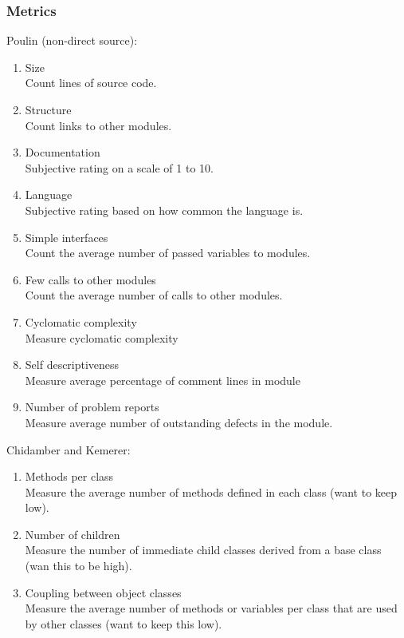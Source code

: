 \documentclass{article}
\begin{document}
\subsubsection{Metrics}
\noindent Poulin (non-direct source):
\begin{enumerate}
	\item Size\\
	
	Count lines of source code.
	\item Structure\\
	
	Count links to other modules.
	\item Documentation\\
	
	Subjective rating on a scale of 1 to 10.
	\item Language\\
	
	Subjective rating based on how common the language is.
	\item Simple interfaces\\
	
	Count the average number of passed variables to modules.
	\item Few calls to other modules\\
	
	Count the average number of calls to other modules.
	\item Cyclomatic complexity\\
	
	Measure cyclomatic complexity
	\item Self descriptiveness\\
	
	Measure average percentage of comment lines in module
	\item Number of problem reports\\
	
	Measure average number of outstanding defects in the module.
\end{enumerate}

\noindent Chidamber and Kemerer:
\begin{enumerate}
	\item Methods per class\\
	
	Measure the average number of methods defined in each class (want to keep low).
	\item Number of children\\
	
	Measure the number of immediate child classes derived from a base class (wan this to be high). 
	\item Coupling between object classes\\
	
	Measure the average number of methods or variables per class that are used by other classes (want to keep this low).
\end{enumerate}
\end{document}
